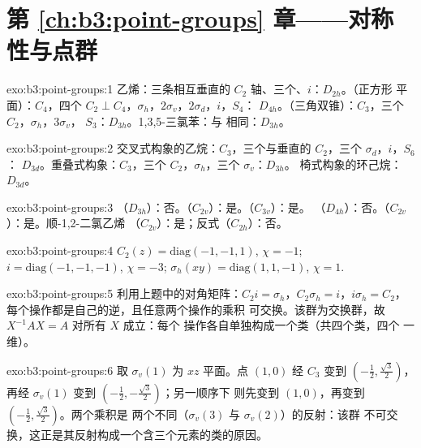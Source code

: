 \section*{第 \ref{ch:b3:point-groups} 章——对称性与点群}

\begin{solution}{exo:b3:point-groups:1}
乙烯：三条相互垂直的 $C_2$ 轴、三个、$i$：$D_{2h}$。（正方形
平面）：$C_4$，四个 $C_2 \perp C_4$，$\sigma_h$，$2\sigma_v$，$2\sigma_d$，$i$，$S_4$：
$D_{4h}$。（三角双锥）：$C_3$，三个 $C_2$，$\sigma_h$，$3\sigma_v$，
$S_3$：$D_{3h}$。1,3,5-三氯苯：与  相同：$D_{3h}$。
\end{solution}

\begin{solution}{exo:b3:point-groups:2}
交叉式构象的乙烷：$C_3$，三个与垂直的 $C_2$，三个 $\sigma_d$，$i$，$S_6$：
$D_{3d}$。重叠式构象：$C_3$，三个 $C_2$，$\sigma_h$，三个 $\sigma_v$：$D_{3h}$。
椅式构象的环己烷：$D_{3d}$。
\end{solution}

\begin{solution}{exo:b3:point-groups:3}
（$D_{3h}$）：否。（$C_{2v}$）：是。（$C_{3v}$）：是。
（$D_{4h}$）：否。（$C_{2v}$）：是。顺-1,2-二氯乙烯
（$C_{2v}$）：是；反式（$C_{2h}$）：否。
\end{solution}

\begin{solution}{exo:b3:point-groups:4}
$C_2(z) = \mathrm{diag}(-1,-1,1)$, $\chi = -1$; $i = \mathrm{diag}(-1,-1,-1)$,
$\chi = -3$; $\sigma_h(xy) = \mathrm{diag}(1,1,-1)$, $\chi = 1$.
\end{solution}

\begin{solution}{exo:b3:point-groups:5}
利用上题中的对角矩阵：$C_2i = \sigma_h$，$C_2\sigma_h =
i$，$i\sigma_h = C_2$，每个操作都是自己的逆，且任意两个操作的乘积
可交换。该群为交换群，故 $X^{-1}AX = A$ 对所有 $X$ 成立：每个
操作各自单独构成一个类（共四个类，四个
一维）。
\end{solution}

\begin{solution}{exo:b3:point-groups:6}
取 $\sigma_v(1)$ 为 $xz$ 平面。点 $(1,0)$ 经 $C_3$ 变到 $(-\frac12,
\frac{\sqrt3}2)$，再经 $\sigma_v(1)$ 变到 $(-\frac12,-\frac{\sqrt3}2)$；另一顺序下
则先变到 $(1,0)$，再变到 $(-\frac12,\frac{\sqrt3}2)$。两个乘积是
两个不同（$\sigma_v(3)$ 与 $\sigma_v(2)$）的反射：该群
不可交换，这正是其反射构成一个含三个元素的类的原因。
\end{solution}

